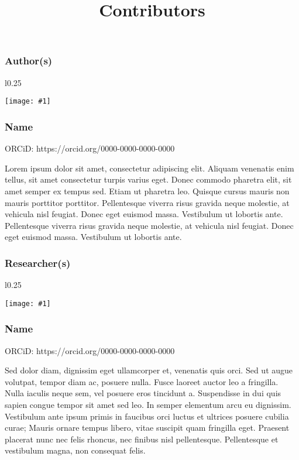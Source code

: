 \documentclass{article}
\newlength{\imgwidth}
\newcommand\scaledgraphics[2]{%
                
\settowidth{\imgwidth}{\texttt{[image: \#1]}}%
                
\setlength{\imgwidth}{\minof{\imgwidth}{#2\textwidth}}%
                
\texttt{[image: \#1]}%
                
}
\begin{document}
\title{Contributors}

\maketitle


\subsubsection{Author(s)}\label{H8801368}


\begin{wrapfigure}{l}{0.25\textwidth}
\scaledgraphics{6fe34584-8d69-4802-be0e-a281121840ac.png}{0.25}
\label{F23538191}
\end{wrapfigure}


\subsubsection{Name}\label{H7011072}



ORCiD: https://orcid.org/0000-0000-0000-0000


Lorem ipsum dolor sit amet, consectetur adipiscing elit. Aliquam venenatis enim tellus, sit amet consectetur turpis varius eget. Donec commodo pharetra elit, sit amet semper ex tempus sed. Etiam ut pharetra leo. Quisque cursus mauris non mauris porttitor porttitor. Pellentesque viverra risus gravida neque molestie, at vehicula nisl feugiat. Donec eget euismod massa. Vestibulum ut lobortis ante. Pellentesque viverra risus gravida neque molestie, at vehicula nisl feugiat. Donec eget euismod massa. Vestibulum ut lobortis ante.


\subsubsection{Researcher(s)}\label{H319339}


\begin{wrapfigure}{l}{0.25\textwidth}
\scaledgraphics{1fa18e9f-eb2d-44f8-a1bc-a761a09f972e.png}{0.25}
\label{F14184921}
\end{wrapfigure}


\subsubsection{Name}\label{H9896496}



ORCiD: https://orcid.org/0000-0000-0000-0000


Sed dolor diam, dignissim eget ullamcorper et, venenatis quis orci. Sed ut augue volutpat, tempor diam ac, posuere nulla. Fusce laoreet auctor leo a fringilla. Nulla iaculis neque sem, vel posuere eros tincidunt a. Suspendisse in dui quis sapien congue tempor sit amet sed leo. In semper elementum arcu eu dignissim. Vestibulum ante ipsum primis in faucibus orci luctus et ultrices posuere cubilia curae; Mauris ornare tempus libero, vitae suscipit quam fringilla eget. Praesent placerat nunc nec felis rhoncus, nec finibus nisl pellentesque. Pellentesque et vestibulum magna, non consequat felis.
\end{document}
